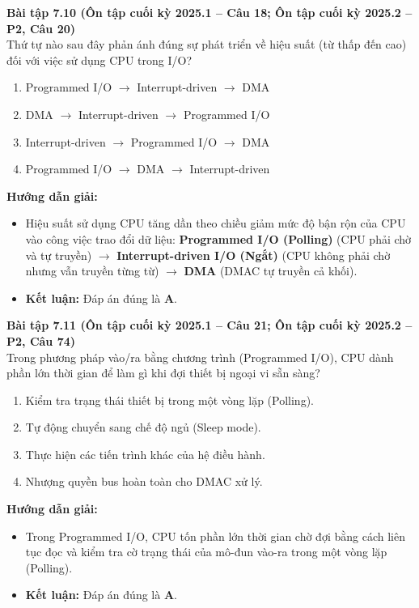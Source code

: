 \textbf{Bài tập 7.10 (Ôn tập cuối kỳ 2025.1 -- Câu 18; Ôn tập cuối kỳ 2025.2 -- P2, Câu 20)}\\
Thứ tự nào sau đây phản ánh đúng sự phát triển về hiệu suất (từ thấp đến cao) đối với việc sử dụng CPU trong I/O?
\begin{enumerate}[label=\Alph*.]
    \item Programmed I/O $\rightarrow$ Interrupt-driven $\rightarrow$ DMA
    \item DMA $\rightarrow$ Interrupt-driven $\rightarrow$ Programmed I/O
    \item Interrupt-driven $\rightarrow$ Programmed I/O $\rightarrow$ DMA
    \item Programmed I/O $\rightarrow$ DMA $\rightarrow$ Interrupt-driven
\end{enumerate}
\textbf{Hướng dẫn giải:}
\begin{itemize}
    \item Hiệu suất sử dụng CPU tăng dần theo chiều giảm mức độ bận rộn của CPU vào công việc trao đổi dữ liệu: \textbf{Programmed I/O (Polling)} (CPU phải chờ và tự truyền) $\rightarrow$ \textbf{Interrupt-driven I/O (Ngắt)} (CPU không phải chờ nhưng vẫn truyền từng từ) $\rightarrow$ \textbf{DMA} (DMAC tự truyền cả khối).
    \item \textbf{Kết luận:} Đáp án đúng là \textbf{A}.
\end{itemize}

\textbf{Bài tập 7.11 (Ôn tập cuối kỳ 2025.1 -- Câu 21; Ôn tập cuối kỳ 2025.2 -- P2, Câu 74)}\\
Trong phương pháp vào/ra bằng chương trình (Programmed I/O), CPU dành phần lớn thời gian để làm gì khi đợi thiết bị ngoại vi sẵn sàng?
\begin{enumerate}[label=\Alph*.]
    \item Kiểm tra trạng thái thiết bị trong một vòng lặp (Polling).
    \item Tự động chuyển sang chế độ ngủ (Sleep mode).
    \item Thực hiện các tiến trình khác của hệ điều hành.
    \item Nhượng quyền bus hoàn toàn cho DMAC xử lý.
\end{enumerate}
\textbf{Hướng dẫn giải:}
\begin{itemize}
    \item Trong Programmed I/O, CPU tốn phần lớn thời gian chờ đợi bằng cách liên tục đọc và kiểm tra cờ trạng thái của mô-đun vào-ra trong một vòng lặp (Polling).
    \item \textbf{Kết luận:} Đáp án đúng là \textbf{A}.
\end{itemize}

